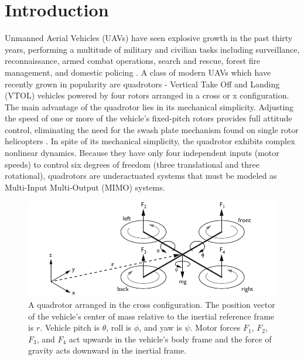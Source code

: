 \chapter{Introduction}

Unmanned Aerial Vehicles (UAVs) have seen explosive growth in the past thirty years, performing a multitude of military and civilian tasks including surveillance, reconnaissance, armed combat operations, search and rescue, forest fire management, and domestic policing \cite{sarris2001survey, valavanis2007advances}. A class of modern UAVs which have recently grown in popularity are quadrotors -  Vertical Take Off and Landing (VTOL) vehicles powered by four rotors arranged in a cross or x configuration. The main advantage of the quadrotor lies in its mechanical simplicity. Adjusting the speed of one or more of the vehicle's fixed-pitch rotors provides full attitude control, eliminating the need for the swash plate mechanism found on single rotor helicopters \cite{bramwell2001bramwell, gupte2012survey}. In spite of its mechanical simplicity, the quadrotor exhibits complex nonlinear dynamics. Because they have only four independent inputs (motor speeds) to control six degrees of freedom (three translational and three rotational), quadrotors are underactuated systems that must be modeled as Multi-Input Multi-Output (MIMO) systems.
\begin{figure}[htb!]
	\centering
	\includegraphics{../fig/quad.pdf}
	\caption{A quadrotor arranged in the cross configuration. The position vector of the vehicle's center of mass relative to the inertial reference frame is $r$. Vehicle pitch is $\theta$, roll is $\phi$, and yaw is $\psi$. Motor forces $F_1$, $F_2$, $F_3$, and $F_4$ act upwards in the vehicle's body frame and the force of gravity acts downward in the inertial frame.}
\end{figure}


